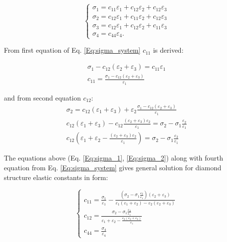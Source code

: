 \begin{equation}
    \label{Eq:sigma_system}
    \begin{cases}
    \sigma_1=c_{11}\varepsilon_1+c_{12}\varepsilon_2+c_{12}\varepsilon_3 \\
    \sigma_2=c_{12}\varepsilon_1+c_{11}\varepsilon_2+c_{12}\varepsilon_3 \\
    \sigma_3=c_{12}\varepsilon_1+c_{12}\varepsilon_2+c_{11}\varepsilon_3 \\
    \sigma_4=c_{44}\varepsilon_4.
    \end{cases}
\end{equation}

From first equation of Eq. \ref{Eq:sigma_system} $c_{11}$ is derived:

\begin{equation}
    \label{Eq:sigma_1}
    \begin{aligned}
        \sigma_1-c_{12}(\varepsilon_2+\varepsilon_3)=c_{11}\varepsilon_1 \\
        c_{11}=\frac{\sigma_1-c_{12}(\varepsilon_2+\varepsilon_3)}{\varepsilon_1}
    \end{aligned}
\end{equation}

and from second equation $c_{12}$:
\begin{equation}
    \label{Eq:sigma_2}
    \begin{aligned}
        \sigma_2=c_{12}(\varepsilon_1+\varepsilon_3)+\varepsilon_2\frac{\sigma_1-c_{12}(\varepsilon_2+\varepsilon_3)}{\varepsilon_1} \\
        c_{12}(\varepsilon_1+\varepsilon_3)-c_{12}\frac{(\varepsilon_2+\varepsilon_3)\varepsilon_2}{\varepsilon_1}=\sigma_2-\sigma_1\frac{\varepsilon_2}{\varepsilon_1} \\
        c_{12}(\varepsilon_1+\varepsilon_2-\frac{(\varepsilon_2+\varepsilon_3)\varepsilon_2}{\varepsilon_1})=\sigma_2-\sigma_1\frac{\varepsilon_2}{\varepsilon_1}
    \end{aligned}
\end{equation}

The equations above (Eq. \ref{Eq:sigma_1}, \ref{Eq:sigma_2}) along with fourth equation from Eq. \ref{Eq:sigma_system} gives general solution for diamond structure elastic constants in form:

\begin{equation}
    \label{Eq:sigma_general}
    \begin{cases}
    c_{11}=\frac{\sigma_1}{\varepsilon_1}-\frac{(\sigma_2-\sigma_1\frac{\varepsilon_2}{\varepsilon_1})(\varepsilon_2+\varepsilon_3)}{\varepsilon_1(\varepsilon_1+\varepsilon_2)-\varepsilon_2(\varepsilon_2+\varepsilon_3)} \\
    c_{12}=\frac{\sigma_2-\sigma_1\frac{\varepsilon_2}{\varepsilon_1}}{\varepsilon_1+\varepsilon_2-\frac{\varepsilon_2(\varepsilon_2+\varepsilon_3)}{\varepsilon_1}}\\
    c_{44}=\frac{\sigma_4}{\varepsilon_4}
    \end{cases}
\end{equation}

